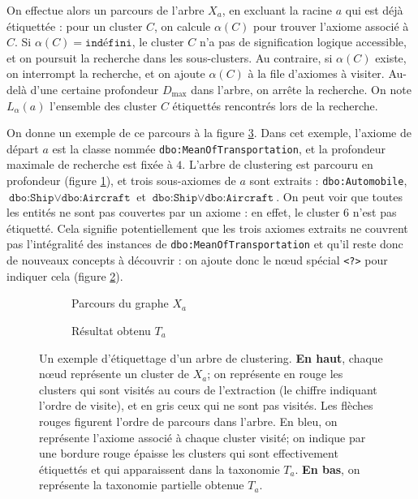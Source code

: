 On effectue alors un parcours de l'arbre $X_a$, en excluant la racine $a$ qui est déjà étiquettée : pour un cluster $C$, on calcule $\alpha(C)$ pour trouver l'axiome associé à $C$. Si $\alpha(C) = \texttt{indéfini}$, le cluster $C$ n'a pas de signification logique accessible, et on poursuit la recherche dans les sous-clusters. Au contraire, si $\alpha(C)$ existe, on interrompt la recherche, et on ajoute $\alpha(C)$ à la file d'axiomes à visiter. Au-delà d'une certaine profondeur $D_\text{max}$ dans l'arbre, on arrête la recherche. On note $L_\alpha(a)$ l'ensemble des cluster $C$ étiquettés rencontrés lors de la recherche.

On donne un exemple de ce parcours à la figure \ref{fig:texp-stebbstep}. Dans cet exemple, l'axiome de départ $a$ est la classe nommée \texttt{dbo:MeanOfTransportation}, et la profondeur maximale de recherche est fixée à $4$. L'arbre de clustering est parcouru en profondeur (figure \ref{subfig:texp-sbs1}), et trois sous-axiomes de $a$ sont extraits : \texttt{dbo:Automobile}, $\texttt{dbo:Ship} \lor \texttt{dbo:Aircraft}$ et $\texttt{dbo:Ship} \lor \texttt{dbo:Aircraft}$. On peut voir que toutes les entités ne sont pas couvertes par un axiome : en effet, le cluster 6 n'est pas étiquetté. Cela signifie potentiellement que les trois axiomes extraits ne couvrent pas l'intégralité des instances de \texttt{dbo:MeanOfTransportation} et qu'il reste donc de nouveaux concepts à découvrir : on ajoute donc le nœud spécial \texttt{<?>} pour indiquer cela (figure \ref{subfig:texp-sbs2}).

\begin{figure}
    \centering
    \begin{subfigure}{\textwidth}
        \centering
        
        \caption{Parcours du graphe $X_a$}
        \label{subfig:texp-sbs1}
    \end{subfigure}
    \begin{subfigure}{\textwidth}
        \centering
        
        \caption{Résultat obtenu $T_a$}
        \label{subfig:texp-sbs2}
    \end{subfigure}
    \caption{Un exemple d'étiquettage d'un arbre de clustering. \textbf{En haut}, chaque nœud représente un cluster de $X_a$; on représente en rouge les clusters qui sont visités au cours de l'extraction (le chiffre indiquant l'ordre de visite), et en gris ceux qui ne sont pas visités. Les flèches rouges figurent l'ordre de parcours dans l'arbre. En bleu, on représente l'axiome associé à chaque cluster visité; on indique par une bordure rouge épaisse les clusters qui sont effectivement étiquettés et qui apparaissent dans la taxonomie $T_a$. \textbf{En bas}, on représente la taxonomie partielle obtenue $T_a$.}
    \label{fig:texp-stebbstep}
\end{figure}

